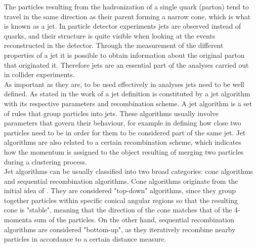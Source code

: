 \documentclass[main]{subfiles} %
\begin{document}
The particles resulting from the hadronization of a single quark (parton) tend to travel in the same direction as their parent forming a narrow cone, which is what is known as a jet. In particle detector experiments jets are observed instead of quarks, and their structure is quite visible when looking at the events reconstructed in the detector. Through the measurement of the different properties of a jet it is possible to obtain information about the original parton that originated it. Therefore jets are an essential part of the analyses carried out in collider experiments.\\

As important as they are, to be used effectively in analyses jets need to be well defined. As stated in the work of \citet{Salam2010} a jet definition is constituted by a jet algorithm with its respective parameters and recombination scheme. A jet algorithm is a set of rules that group particles into jets. These algorithms usually involve parameters that govern their behaviour, for example in defining how close two particles need to be in order for them to be considered part of the same jet. Jet algorithms are also related to a certain recombination scheme, which indicates how the momentum is assigned to the object resulting of merging two particles during a clustering process.\\

Jet algorithms can be usually classified into two broad categories: cone algorithms and sequential recombination algorithms. Cone algorithms originate from the initial idea of \citet{Sterman1977}. They are considered "top-down" algorithms, since they group together particles within specific conical angular regions so that the resulting cone is "stable", meaning that the direction of the cone matches that of the 4-momenta sum of the particles. On the other hand, sequential recombination algorithms are considered "bottom-up", as they iteratively recombine nearby particles in accordance to a certain distance measure.\\
\end{document}

